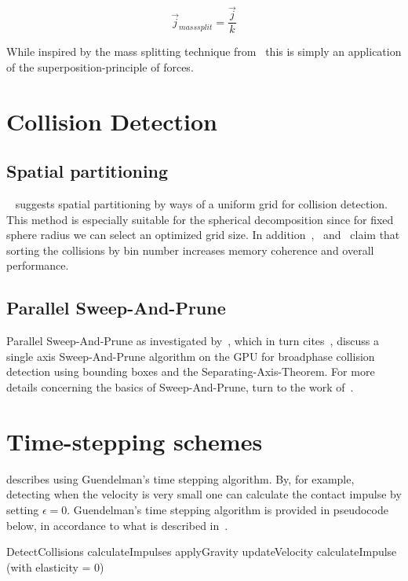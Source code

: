 \begin{equation}
  \vec{j}_{mass split} = \frac{\vec{j}}{k}
\end{equation}

While inspired by the mass splitting technique from~\cite{tonge}
this is simply an application of the superposition-principle
of forces.

\section{Collision Detection}\label{sec:gridCD}
\subsection{Spatial partitioning}
~\cite{gpugems} suggests spatial partitioning
by ways of a uniform grid for collision detection. This method is especially suitable
for the spherical decomposition since for fixed sphere radius we can select an optimized
grid size. In addition~\cite{gpugems},~\cite{green} and~\cite{fastnearest} claim that sorting
the collisions by bin number increases memory coherence and overall performance.
\subsection{Parallel Sweep-And-Prune}
Parallel Sweep-And-Prune as investigated by~\cite{gpupipedev}, which in turn cites~\cite{liu2010}, %
discuss a single axis Sweep-And-Prune algorithm on the GPU for broadphase collision
detection using bounding boxes and the Separating-Axis-Theorem. For more details
concerning the basics of Sweep-And-Prune, turn to the work of~\cite{SAPPierre}.

\section{Time-stepping schemes}
\cite{Lembcke} describes using Guendelman's time stepping
algorithm. By, for example, detecting when the velocity is very small one can
calculate the contact impulse by setting $\epsilon = 0$.
Guendelman's time stepping algorithm is provided in pseudocode below, in accordance
to what is described in~\cite{guendelman}.

\begin{algorithm}[H]
  \begin{algorithmic}[1]
  \State DetectCollisions
    \State calculateImpulses
  \EndFor
  \State applyGravity
  \State updateVelocity
      \State calculateImpulse (with elasticity = 0)
    \EndFor
\end{algorithmic}
\end{algorithm}

